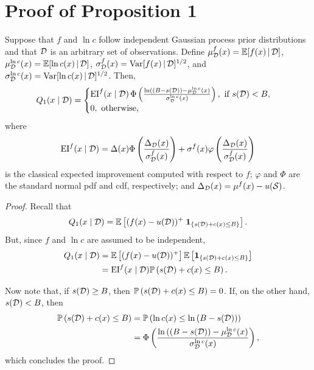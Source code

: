 \section{Proof of Proposition 1}
\label{supp:prop1}
\begin{proposition}
\label{prop:bcei_app}
Suppose that $f$ and $\ln c$ follow independent Gaussian process prior distributions and that $\mathcal{D}$ is an arbitrary set of observations. Define $\mu^f_{\mathcal{D}}(x) = \mathbb{E}[ f(x) \,|\, \mathcal{D}]$, $\mu^{\ln c}_{\mathcal{D}}(x) = \mathbb{E}[ \ln c(x) \,|\, \mathcal{D}]$, $\sigma^f_{\mathcal{D}}(x) = \textnormal{Var}[ f(x) \,|\, \mathcal{D}]^{1/2}$, and $\sigma^{\ln c}_{\mathcal{D}}(x) = \textnormal{Var}[ \ln c(x) \,|\, \mathcal{D}]^{1/2}$. Then,
\begin{equation*}
    Q_1(x\mid \mathcal{D}) = \begin{cases} \textnormal{EI}^f(x\mid\mathcal{D}) \, \Phi\left(\frac{\ln\left((B - s(\mathcal{D})\right) - \mu_{\mathcal{D}}^{\ln c}(x)}{\sigma_{\mathcal{D}}^{\ln c}(x)} \right), \textnormal{ if } s(\mathcal{D}) < B,\\
0, \textnormal{ otherwise,}
\end{cases}
\end{equation*}
where
\begin{equation*}
\textnormal{EI}^f(x\mid\mathcal{D}) = \Delta(x)\Phi\left(\frac{\Delta_{\mathcal{D}}(x)}{\sigma_{\mathcal{D}}^f(x)}\right) + \sigma^f(x)\varphi\left(\frac{\Delta_{\mathcal{D}}(x)}{\sigma_{\mathcal{D}}^f(x)}\right)    
\end{equation*}
is the classical expected improvement computed with respect to $f$; $\varphi$ and $\Phi$ are the standard normal pdf and cdf, respectively; and $\Delta_{\mathcal{D}}(x) = \mu^f(x) -  u(\mathcal{S})$.
\end{proposition}
\begin{proof}
Recall that
\begin{equation*}
     Q_1(x \mid \mathcal{D}) = \mathbb{E}\left[(f(x) - u(\mathcal{D}))^+\; \mathbf{1}_{\{s(\mathcal{D}) + c(x) \leq B\}}\right].
\end{equation*}
But, since $f$ and $\ln c$ are assumed to be independent, 
\begin{align*}
     Q_1(x \mid \mathcal{D}) &= \mathbb{E}\left[(f(x) - u(\mathcal{D}))^+\right] \mathbb{E}\left[\mathbf{1}_{\{s(\mathcal{D}) + c(x) \leq B\}}\right]\\
     &= \mathrm{EI}^f(x\mid\mathcal{D}) \mathbb{P}\left(s(\mathcal{D}) + c(x) \leq B\right).
\end{align*}

Now note that, if $s(\mathcal{D}) \geq B$, then $\mathbb{P}\left(s(\mathcal{D}) + c(x) \leq B\right)=0$. If, on the other hand, $s(\mathcal{D}) < B$, then
\begin{align*}
    \mathbb{P}\left(s(\mathcal{D}) + c(x) \leq B\right) & = \mathbb{P}\left(\ln c(x) \leq \ln\left(B - s(\mathcal{D})\right)\right)\\
    &= \Phi\left(\frac{\ln\left((B - s(\mathcal{D})\right) - \mu_{\mathcal{D}}^{\ln c}(x)}{\sigma_{\mathcal{D}}^{\ln c}(x)} \right),
\end{align*}
which concludes the proof.
\end{proof}


